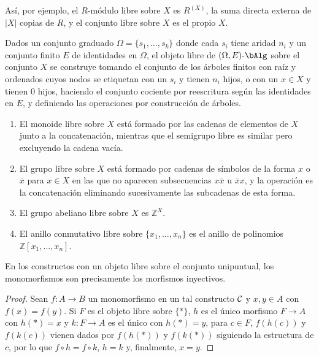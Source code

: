 Así, por ejemplo, el $R$-módulo libre sobre $X$ es $R^{(X)}$, la suma directa
externa de $|X|$ copias de $R$, y el conjunto libre sobre $X$ es el propio $X$.

\begin{proposition}\label{prop:free-algebra}
  Dados un conjunto graduado $\Omega=\{s_1,\dots,s_k\}$ donde cada $s_i$ tiene
  aridad $n_i$ y un conjunto finito $E$ de identidades en $\Omega$, el objeto
  libre de $(\Omega,E)\dash\bAlg$ sobre el conjunto $X$ se construye tomando el
  conjunto de los árboles finitos con raíz y ordenados cuyos nodos se etiquetan
  con un $s_i$ y tienen $n_i$ hijos, o con un $x\in X$ y tienen 0 hijos,
  haciendo el conjunto cociente por reescritura según las identidades en $E$, y
  definiendo las operaciones por construcción de árboles.
\end{proposition}

\begin{example}\;
  \begin{enumerate}
  \item El monoide libre sobre $X$ está formado por las cadenas de elementos de
    $X$ junto a la concatenación, mientras que el semigrupo libre es similar
    pero excluyendo la cadena vacía.
  \item El grupo libre sobre $X$ está formado por cadenas de símbolos de la
    forma $x$ o $\overline x$ para $x\in X$ en las que no aparecen subsecuencias
    $x\overline x$ u $\overline xx$, y la operación es la concatenación
    eliminando sucesivamente las subcadenas de esta forma.
  \item El grupo abeliano libre sobre $X$ es $\mathbb{Z}^X$.
  \item El anillo conmutativo libre sobre $\{x_1,\dots,x_n\}$ es el anillo de
    polinomios $\mathbb{Z}[x_1,\dots,x_n]$.
  \end{enumerate}
\end{example}

\begin{proposition}
  En los constructos con un objeto libre sobre el conjunto unipuntual, los
  monomorfismos son precisamente los morfismos inyectivos.
\end{proposition}
\begin{proof}
  Sean $f:A\to B$ un monomorfismo en un tal constructo $\mathcal{C}$ y $x,y\in A$ con
  $f(x)=f(y)$. Si $F$ es el objeto libre sobre $\{*\}$, $h$ es el único morfismo
  $F\to A$ con $h(*)=x$ y $k:F\to A$ es el único con $h(*)=y$, para $c\in F$,
  $f(h(c))$ y $f(k(c))$ vienen dados por $f(h(*))$ y $f(k(*))$ siguiendo la
  estructura de $c$, por lo que $f\circ h=f\circ k$, $h=k$ y, finalmente, $x=y$.
\end{proof}

